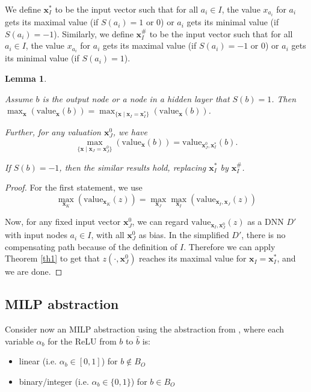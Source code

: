 \documentclass[]{article}
\newtheorem{lemma}{Lemma}
\theoremstyle{definition}
\newcommand{\Val}{\mathrm{value}}
\begin{document}
We define $\boldsymbol{x}_I^*$ to be the input vector such that for all $a_i \in I$, the value $x_{a_i}$ for $a_i$ gets its maximal value (if $S(a_i)=1$ or $0$) or $a_i$ gets its minimal value (if $S(a_i)=-1$). Similarly, we define $\boldsymbol{x}_I^\#$ to be the input vector such that for all $a_i \in I$, the value $x_{a_i}$ for $a_i$ gets its maximal value (if $S(a_i)=-1$ or $0$) or $a_i$ gets its minimal value (if $S(a_i)=1$).



\begin{lemma} \label{lem:reach_max_2}
	
	Assume $b$ is the output node or a node in a hidden layer that $S(b)=1$. Then
	$\max_{\boldsymbol{x}} (\Val_{\boldsymbol{x}}(b)) =\max_{\{\boldsymbol{x} \mid \boldsymbol{x}_I=\boldsymbol{x}^*_I\}} (\Val_{\boldsymbol{x}}(b))$.
	
	Further,  for any valuation $\boldsymbol{x}^0_J$, 
	we have $$\max_{\{\boldsymbol{x} \mid \boldsymbol{x}_J=\boldsymbol{x}^0_J\}} (\Val_{\boldsymbol{x}}(b)) =  \Val_{\boldsymbol{x}^0_J,\boldsymbol{x}_I^*}(b).$$
	
	If $S(b)=-1$, then the similar results hold, replacing $\boldsymbol{x}^*_I$ by $\boldsymbol{x}^\#_I$. 
\end{lemma}

\begin{proof}
	For the first statement, we use 
	$$\max_{\boldsymbol{x}_K} (\Val_{\boldsymbol{x}_K}(z)) =\max_{\boldsymbol{x}_J} \max_{\boldsymbol{x}_I} (\Val_{\boldsymbol{x}_I,\boldsymbol{x}_J}(z))$$
	
	Now, for any fixed input vector $\boldsymbol{x}^0_J$, we can regard $\Val_{\boldsymbol{x}_I,\boldsymbol{x}^0_J}(z)$ as a DNN $D'$ with input nodes $a_i\in I$, with all $\boldsymbol{x}^0_J$ %
	as bias. In the simplified $D'$, there is no compensating path because of the definition of $I$. Therefore we can apply Theorem \ref{th1} to get that $z(\cdot,\boldsymbol{x}^0_J)$ reaches its maximal value for $\boldsymbol{x}_I=\boldsymbol{x}_I^*$, and we are done.
\end{proof}


\subsection{MILP abstraction}

Consider now an MILP abstraction using the abstraction from \cite{MILP}, 
where each variable $\alpha_b$ for the ReLU from $b$ to $\hat{b}$ is:
\begin{itemize}
	\item linear  (i.e. $\alpha_b \in [0,1]$) for $b \notin B_{O}$
	\item binary/integer (i.e. $\alpha_b \in \{0,1\}$) for $b \in B_{O}$
\end{itemize}
\end{document}
